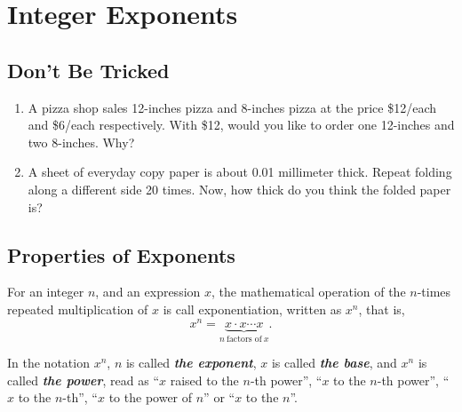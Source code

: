 \documentclass[en,11pt]{elegantbook}
\newcommand{\size}[2]{{\fontsize{#1}{0}\selectfont#2}}
\newenvironment{rmdthink}{
	\vspace*{0.5\baselineskip}
	\par\noindent
	\makebox[-4pt][r]{\color{green!90}\size{12}{\faLightbulbO}\,\,}
    \begin{tcolorbox}[
    enhanced,
    title={\textbf{\color{second}Think}},
    title style={left color=blue!10!green!20!white,right color=yellow!20!blue!20!white},
    colback=green!20!white,
    ]
    \sffamily
}{
    \end{tcolorbox}
	\par\ignorespacesafterend
}
\begin{document}
\hypertarget{integer-exponents}{%
\chapter{Integer Exponents}\label{integer-exponents}}

\hypertarget{dont-be-tricked}{%
\section{Don't Be Tricked}\label{dont-be-tricked}}

\begin{rmdthink}

\begin{enumerate}
\def\labelenumi{\arabic{enumi}.}
\item
  A pizza shop sales 12-inches pizza and 8-inches pizza at the price \$12/each and \$6/each respectively. With \$12, would you like to order one 12-inches and two 8-inches. Why?
\item
  A sheet of everyday copy paper is about 0.01 millimeter thick. Repeat folding along a different side 20 times. Now, how thick do you think the folded paper is?
\end{enumerate}

\end{rmdthink}

\hypertarget{properties-of-exponents}{%
\section{Properties of Exponents}\label{properties-of-exponents}}

For an integer \(n\), and an expression \(x\), the mathematical operation of the \(n\)-times repeated multiplication of \(x\) is call exponentiation, written as \(x^n\), that is,
\[
x^n=\underbrace{x\cdot x \cdots x}_{n~\text{factors of}~x}.
\]

In the notation \(x^n\), \(n\) is called \textbf{\emph{the exponent}}, \(x\) is called \textbf{\emph{the base}}, and \(x^n\) is called \textbf{\emph{the power}}, read as ``\(x\) raised to the \(n\)-th power'', ``\(x\) to the \(n\)-th power'', ``\(x\) to the \(n\)-th'', ``\(x\) to the power of \(n\)'' or ``\(x\) to the \(n\)''.
\end{document}
